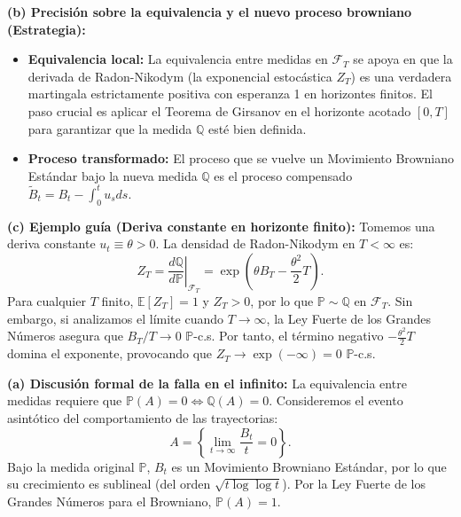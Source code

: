 \documentclass[11pt, letterpaper]{article}
\begin{document}
\vspace{5mm}

\begin{solucion}
    \textbf{(b) Precisión sobre la equivalencia y el nuevo proceso browniano (Estrategia):}
    \begin{itemize}
        \item[(i)] \textbf{Equivalencia local:} La equivalencia entre medidas en $\mathcal{F}_T$ se apoya en que la derivada de Radon-Nikodym (la exponencial estocástica $Z_T$) es una verdadera martingala estrictamente positiva con esperanza 1 en horizontes finitos. El paso crucial es aplicar el Teorema de Girsanov en el horizonte acotado $[0, T]$ para garantizar que la medida $\mathbb{Q}$ esté bien definida.
        \item[(ii)] \textbf{Proceso transformado:} El proceso que se vuelve un Movimiento Browniano Estándar bajo la nueva medida $\mathbb{Q}$ es el proceso compensado $\tilde{B}_t = B_t - \int_0^t u_s ds$.
    \end{itemize}

    \vspace{3mm}
    \textbf{(c) Ejemplo guía (Deriva constante en horizonte finito):}
    Tomemos una deriva constante $u_t \equiv \theta > 0$. La densidad de Radon-Nikodym en $T < \infty$ es:
    \[ Z_T = \left.\frac{d\mathbb{Q}}{d\mathbb{P}}\right|_{\mathcal{F}_T} = \exp\left( \theta B_T - \frac{\theta^2}{2}T \right). \]
    Para cualquier $T$ finito, $\mathbb{E}[Z_T] = 1$ y $Z_T > 0$, por lo que $\mathbb{P} \sim \mathbb{Q}$ en $\mathcal{F}_T$. Sin embargo, si analizamos el límite cuando $T \to \infty$, la Ley Fuerte de los Grandes Números asegura que $B_T/T \to 0$ $\mathbb{P}$-c.s. Por tanto, el término negativo $-\frac{\theta^2}{2}T$ domina el exponente, provocando que $Z_T \to \exp(-\infty) = 0$ $\mathbb{P}$-c.s.

    \vspace{3mm}
    \textbf{(a) Discusión formal de la falla en el infinito:}
    La equivalencia entre medidas requiere que $\mathbb{P}(A) = 0 \iff \mathbb{Q}(A) = 0$. Consideremos el evento asintótico del comportamiento de las trayectorias:
    \[ A = \left\{ \lim_{t \to \infty} \frac{B_t}{t} = 0 \right\}. \]
    Bajo la medida original $\mathbb{P}$, $B_t$ es un Movimiento Browniano Estándar, por lo que su crecimiento es sublineal (del orden $\sqrt{t \log \log t}$). Por la Ley Fuerte de los Grandes Números para el Browniano, $\mathbb{P}(A) = 1$.
    

\end{solucion}
\end{document}
